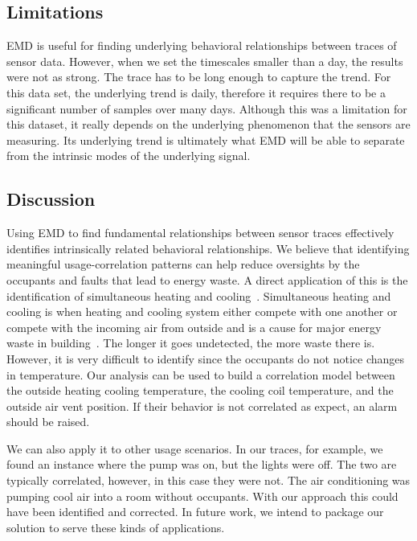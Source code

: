 \subsection{Limitations}
EMD is useful for finding underlying behavioral relationships between traces of sensor data.  However,
when we set the timescales smaller than a day, the results were not as strong.
The trace has to be long enough to capture the trend.  For this data set, the underlying
trend is daily, therefore it requires there to be a significant number of samples over many days.
Although this was a limitation for this dataset, it really depends on the underlying phenomenon that
the sensors are measuring.  Its underlying trend is ultimately what EMD will be able to separate
from the intrinsic modes of the underlying signal.

\subsection{Discussion}
Using EMD to find fundamental relationships between sensor traces effectively identifies intrinsically
related behavioral relationships.
We believe that identifying meaningful usage-correlation patterns can help reduce oversights
by the occupants and faults that lead to energy waste.  A direct application of this is the identification
of simultaneous heating and cooling~\cite{simheatcool}.  Simultaneous heating and cooling is when heating
and cooling system either compete with one another or compete with the incoming air from outside and is
a cause for major energy waste in building~\cite{simheatcool}.  The longer it goes undetected,
the more waste there is.  However, it is very difficult to identify since the occupants do not notice
changes in temperature.  Our analysis can be used to build a correlation model between the outside
heating cooling temperature, the cooling coil temperature, and the outside air vent position.  If their behavior
is not correlated as expect, an alarm should be raised.

We can also apply it to other usage scenarios.  In our traces, for example, we found an instance where the pump
was on, but the lights were off.  The two are typically correlated, however, in this case they were not.
The air conditioning was pumping cool air into a room without occupants.
With our approach this could have been identified and corrected.  In future work, we intend to
package our solution to serve these kinds of applications.

